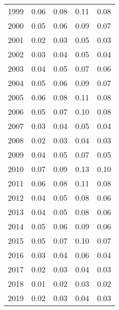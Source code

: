 \documentclass[11pt]{book}
\begin{document}
\begin{longtable}[]{@{}lrrrr@{}}
1999 & 0.06 & 0.08 & 0.11 & 0.08\tabularnewline
2000 & 0.05 & 0.06 & 0.09 & 0.07\tabularnewline
2001 & 0.02 & 0.03 & 0.05 & 0.03\tabularnewline
2002 & 0.03 & 0.04 & 0.05 & 0.04\tabularnewline
2003 & 0.04 & 0.05 & 0.07 & 0.06\tabularnewline
2004 & 0.05 & 0.06 & 0.09 & 0.07\tabularnewline
2005 & 0.06 & 0.08 & 0.11 & 0.08\tabularnewline
2006 & 0.05 & 0.07 & 0.10 & 0.08\tabularnewline
2007 & 0.03 & 0.04 & 0.05 & 0.04\tabularnewline
2008 & 0.02 & 0.03 & 0.04 & 0.03\tabularnewline
2009 & 0.04 & 0.05 & 0.07 & 0.05\tabularnewline
2010 & 0.07 & 0.09 & 0.13 & 0.10\tabularnewline
2011 & 0.06 & 0.08 & 0.11 & 0.08\tabularnewline
2012 & 0.04 & 0.05 & 0.08 & 0.06\tabularnewline
2013 & 0.04 & 0.05 & 0.08 & 0.06\tabularnewline
2014 & 0.05 & 0.06 & 0.09 & 0.06\tabularnewline
2015 & 0.05 & 0.07 & 0.10 & 0.07\tabularnewline
2016 & 0.03 & 0.04 & 0.06 & 0.04\tabularnewline
2017 & 0.02 & 0.03 & 0.04 & 0.03\tabularnewline
2018 & 0.01 & 0.02 & 0.03 & 0.02\tabularnewline
2019 & 0.02 & 0.03 & 0.04 & 0.03\tabularnewline
\bottomrule
\end{longtable}
\clearpage
\end{document}
